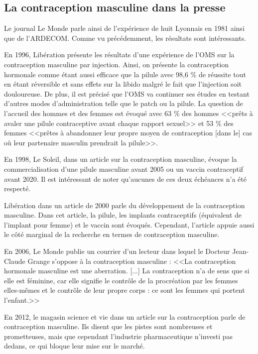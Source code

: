 \documentclass[12pt,a4paper]{report}
\begin{document}
\subsection{La contraception masculine dans la presse}

Le journal Le Monde parle ainsi de l'expérience de huit Lyonnais en 1981 ainsi que de l'ARDECOM. Comme vu précédemment, les résultats sont intéressants. \cite{ContraceptionSeDecline1982}

En 1996, Libération présente les résultats d'une expérience de l'OMS sur la contraception masculine par injection. Ainsi, on présente la contraception hormonale comme étant aussi efficace que la pilule avec 98,6 \% de réussite tout en étant réversible et sans effets sur la libido malgré le fait que l'injection soit douloureuse. De plus, il est précisé que l'OMS va continuer ses études en testant d'autres modes d'administration telle que le patch ou la pilule. La question de l'accueil des hommes et des femmes est évoqué avec 63 \% des hommes <<prêts à avaler une pilule contraceptive avant chaque rapport sexuel>> et 53 \% des femmes <<prêtes à abandonner leur propre moyen de contraception [dans le] cas où leur partenaire masculin prendrait la pilule>>. \cite{beatriceContraceptifMasculinEfficace1996a}

En 1998, Le Soleil, dans un article sur la contraception masculine, évoque la commercialisation d'une pilule masculine avant 2005 ou un vaccin contraceptif avant 2020. Il est intéressant de noter qu'aucunes de ces deux échéances n'a été respecté. \cite{drapeauObjectifNeutraliserSperme1998}

Libération dans un article de 2000 parle du développement de la contraception masculine. Dans cet article, la pilule, les implants contraceptifs (équivalent de l'implant pour femme) et le vaccin sont évoqués. Cependant, l'article appuie aussi le côté marginal de la recherche en termes de contraception masculine. \cite{ericContraceptionCeQui2000}

En 2006, Le Monde publie un courrier d'un lecteur dans lequel le Docteur Jean-Claude Grange s'oppose à la contraception masculine : <<La contraception hormonale masculine est une aberration. [...] La contraception n'a de sens que si elle est féminine, car elle signifie le contrôle de la procréation par les femmes elles-mêmes et le contrôle de leur propre corps : ce sont les femmes qui portent l'enfant.>> \cite{josephTravailleusesSexe2006}

En 2012, le magasin science et vie dans un article sur la contraception parle de contraception masculine. Ils disent que les pistes sont nombreuses et prometteuses, mais que cependant l'industrie pharmaceutique n'investi pas dedans, ce qui bloque leur mise sur le marché. \cite{bettayebRecherchePrometEnfin2012}
\end{document}
